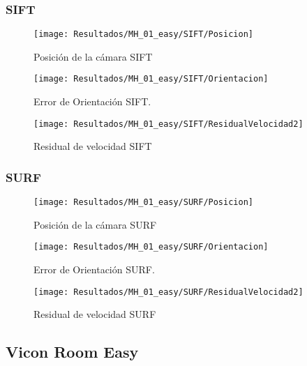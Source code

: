 \subsubsection{SIFT}


\begin{figure}[H]
	\centering
	\texttt{[image: Resultados/MH\_01\_easy/SIFT/Posicion]}
	\caption{Posición de la cámara SIFT}
	\label{imagen:Resultados/MH_01_easy/SIFT/Posicion}
\end{figure}


\begin{figure}[H]
	\centering
	\texttt{[image: Resultados/MH\_01\_easy/SIFT/Orientacion]}
	\caption[Error de Orientación SIFT]{Error de Orientación SIFT.}
	\label{imagen:Resultados/MH_01_easy/SIFT/Orientacion}
\end{figure}



\begin{figure}[H]
	\centering
	\texttt{[image: Resultados/MH\_01\_easy/SIFT/ResidualVelocidad2]}
	\caption{Residual de velocidad SIFT}
	\label{imagen:Resultados/MH_01_easy/SIFT/ResidualVelocidad}
\end{figure}

\subsubsection{SURF}


\begin{figure}[H]
	\centering
	\texttt{[image: Resultados/MH\_01\_easy/SURF/Posicion]}
	\caption{Posición de la cámara SURF}
	\label{imagen:Resultados/MH_01_easy/SURF/Posicion}
\end{figure}


\begin{figure}[H]
	\centering
	\texttt{[image: Resultados/MH\_01\_easy/SURF/Orientacion]}
	\caption[Error de Orientación SURF]{Error de Orientación SURF.}
	\label{imagen:Resultados/MH_01_easy/SURF/Orientacion}
\end{figure}



\begin{figure}[H]
	\centering
	\texttt{[image: Resultados/MH\_01\_easy/SURF/ResidualVelocidad2]}
	\caption{Residual de velocidad SURF}
	\label{imagen:Resultados/MH_01_easy/SURF/ResidualVelocidad}
\end{figure}



\subsection{Vicon Room Easy}

